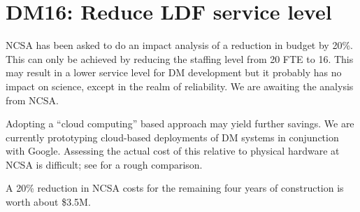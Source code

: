\section{DM16: Reduce LDF service level}\label{sect:dm16}

NCSA has been  asked to do an impact analysis of a reduction in budget by 20\%.
This can only be achieved by reducing the staffing level from 20 FTE to 16.
This may result in a lower service level for DM development but it probably has no impact on science, except in the realm of reliability.
We are awaiting the analysis from NCSA.

Adopting a ``cloud computing'' based approach may yield further savings.
We are currently prototyping cloud-based deployments of DM systems in conjunction with Google.
Assessing the actual cost of this relative to physical hardware at NCSA is difficult; see  for a rough comparison.

A 20\% reduction in NCSA costs for the remaining four years of construction is worth about \$3.5M.
